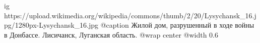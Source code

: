  
 
 
 
 

\ifcmt
  ig https://upload.wikimedia.org/wikipedia/commons/thumb/2/20/Lysychansk_16.jpg/1280px-Lysychansk_16.jpg
  @caption Жилой дом, разрушенный в ходе войны в Донбассе. Лисичанск, Луганская область.
	@wrap center
	@width 0.6
\fi
